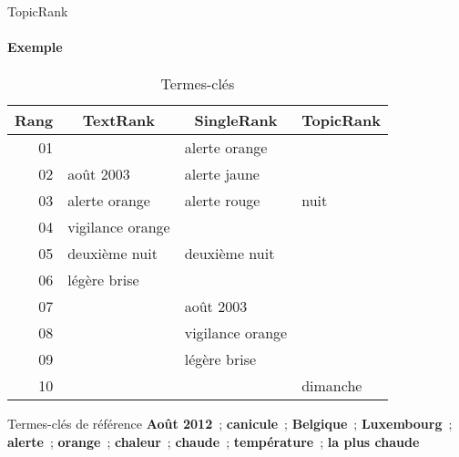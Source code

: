 \begin{frame}{TopicRank}\framesubtitle{Exemple}
  \begin{table}
    \centering
    \begin{tabular}{r|l|l|l}
      \toprule
      \textbf{Rang} & \multicolumn{1}{c|}{\textbf{TextRank}} &
      \multicolumn{1}{c|}{\textbf{SingleRank}} & \multicolumn{1}{c}{\textbf{TopicRank}} \\
      \hline
      01 & \cellcolor{termithorange!30}{août 2012} & alerte orange & \cellcolor{termithorange!30}{Luxembourg}\\
      02 & août 2003 & alerte jaune & \cellcolor{termithorange!30}{alerte} \\
      03 & alerte orange & alerte rouge & nuit \\
      04 & vigilance orange & \cellcolor{termithorange!30}{alerte} & \cellcolor{termithorange!30}{Belgique} \\
      05 & deuxième nuit & deuxième nuit & \cellcolor{termithorange!30}{août 2012}\\
      06 & légère brise & \cellcolor{termithorange!30}{août 2012} & \cellcolor{termithorange!30}{chaleur} \\
      07 & & août 2003 & \cellcolor{termithorange!30}{température} \\
      08 & & vigilance orange & \cellcolor{termithorange!30}{chaude} \\
      09 & & légère brise & \cellcolor{termithorange!30}{canicule} \\
      10 & & \cellcolor{termithorange!30}{Luxembourg} & dimanche \\
      \bottomrule
    \end{tabular}

    \caption{Termes-clés}
  \end{table}

  \begin{exampleblock}{\small Termes-clés de référence}\justifying\small
    \textbf{Août 2012}~; \textbf{canicule}~;
    \textbf{Belgique}~; \textbf{Luxembourg}~; \textbf{alerte}~;
    \textbf{orange}~; \textbf{chaleur}~; \textbf{chaude}~;
    \textbf{température}~; \textbf{la plus chaude}
  \end{exampleblock}
\end{frame}

